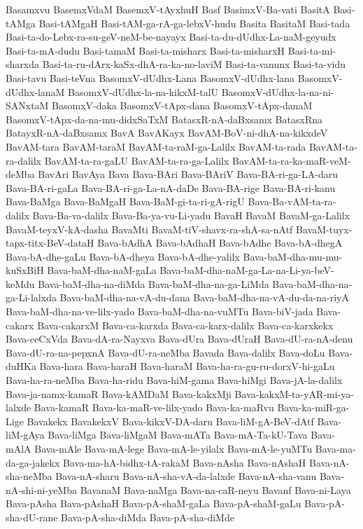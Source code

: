 {Basamxvu
BasemxVdaM
BasemxV-tAyxhuH
Basf
BasimxV-Ba-vati
BasitA
Basi-tAMga
Basi-tAMgaH
Basi-tAM-ga-rA-ga-lebxV-hudu
Basita
BasitaM
Basi-tada
Basi-ta-do-Lebx-ra-su-geV-neM-be-nayayx
Basi-ta-du-dUdhx-La-naM-geyudx
Basi-ta-mA-dudu
Basi-tamaM
Basi-ta-misharx
Basi-ta-misharxH
Basi-ta-mi-sharxda
Basi-ta-ru-dArx-kaSx-dhA-ra-ka-no-laviM
Basi-ta-vanunx
Basi-ta-vidu
Basi-tavu
Basi-teVna
BasomxV-dUdhx-Lana
BasomxV-dUdhx-lana
BasomxV-dUdhx-lanaM
BasomxV-dUdhx-la-na-kikxM-talU
BasomxV-dUdhx-la-na-ni-SANxtaM
BasomxV-daka
BasomxV-tApx-dana
BasomxV-tApx-danaM
BasomxV-tApx-da-na-mu-didxSaTxM
BatasxR-nA-daBxsamx
BatasxRna
BatayxR-nA-daBxsamx
BavA
BavAKayx
BavAM-BoV-ni-dhA-na-kikxdeV
BavAM-tara
BavAM-taraM
BavAM-ta-raM-ga-Lalilx
BavAM-ta-rada
BavAM-ta-ra-dalilx
BavAM-ta-ra-gaLU
BavAM-ta-ra-ga-Lalilx
BavAM-ta-ra-ka-maR-veM-deMba
BavAri
BavAya
Bava
Bava-BAri
Bava-BAriV
Bava-BA-ri-ga-LA-daru
Bava-BA-ri-gaLa
Bava-BA-ri-ga-La-nA-daDe
Bava-BA-rige
Bava-BA-ri-kanu
Bava-BaMga
Bava-BaMgaH
Bava-BaM-gi-ta-ri-gA-rigU
Bava-Ba-vAM-ta-ra-dalilx
Bava-Ba-va-dalilx
Bava-Ba-ya-vu-Li-yadu
BavaH
BavaM
BavaM-ga-Lalilx
BavaM-teyxV-kA-dasha
BavaMti
BavaM-tiV-shavx-ra-shA-sa-nAtf
BavaM-tuyx-tapx-titx-BeV-dataH
Bava-bAdhA
Bava-bAdhaH
Bava-bAdhe
Bava-bA-dhegA
Bava-bA-dhe-gaLu
Bava-bA-dheya
Bava-bA-dhe-yalilx
Bava-baM-dha-mu-mu-kuSxBiH
Bava-baM-dha-naM-gaLa
Bava-baM-dha-naM-ga-La-na-Li-ya-beV-keMdu
Bava-baM-dha-na-diMda
Bava-baM-dha-na-ga-LiMda
Bava-baM-dha-na-ga-Li-lalxda
Bava-baM-dha-na-vA-du-dana
Bava-baM-dha-na-vA-du-da-na-riyA
Bava-baM-dha-na-ve-lilx-yado
Bava-baM-dha-na-vuMTu
Bava-biV-jada
Bava-cakarx
Bava-cakarxM
Bava-ca-karxda
Bava-ca-karx-dalilx
Bava-ca-karxkekx
Bava-ceCxVda
Bava-dA-ra-Nayxva
Bava-dUra
Bava-dUraH
Bava-dU-ra-nA-denu
Bava-dU-ra-na-pepxnA
Bava-dU-ra-neMba
Bavada
Bava-dalilx
Bava-doLu
Bava-duHKa
Bava-hara
Bava-haraH
Bava-haraM
Bava-ha-ra-gu-ru-dorxV-hi-gaLu
Bava-ha-ra-neMba
Bava-ha-ridu
Bava-hiM-gama
Bava-hiMgi
Bava-jA-la-dalilx
Bava-ja-namx-kamaR
Bava-kAMDaM
Bava-kakxMji
Bava-kakxM-ta-yAR-mi-ya-lalxde
Bava-kamaR
Bava-ka-maR-ve-lilx-yado
Bava-ka-maRvu
Bava-ka-miR-ga-Lige
Bavakekx
BavakekxV
Bava-kikxV-DA-daru
Bava-liM-gA-BeV-dAtf
Bava-liM-gAya
Bava-liMga
Bava-liMgaM
Bava-mATa
Bava-mA-Ta-kU-Tava
Bava-mAlA
Bava-mAle
Bava-mA-lege
Bava-mA-le-yilalx
Bava-mA-le-yuMTu
Bava-ma-da-ga-jakekx
Bava-ma-hA-bidhx-tA-rakaM
Bava-nAsha
Bava-nAshaH
Bava-nA-sha-neMba
Bava-nA-sharu
Bava-nA-sha-vA-da-lalxde
Bava-nA-sha-vanu
Bava-nA-shi-ni-yeMba
BavanaM
Bava-naMga
Bava-na-caR-neyu
Bavanf
Bava-ni-Laya
Bava-pAsha
Bava-pAshaH
Bava-pA-shaM-gaLa
Bava-pA-shaM-gaLu
Bava-pA-sha-dU-rane
Bava-pA-sha-diMda
Bava-pA-sha-diMde
}
